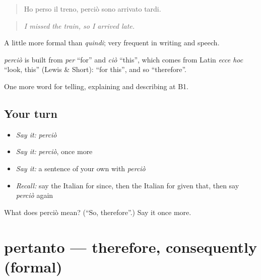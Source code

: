 \begin{quote}
Ho perso il treno, perciò sono arrivato tardi.
\end{quote}

\begin{quote}
\emph{I missed the train, so I arrived late.}
\end{quote}

A little more formal than \emph{quindi}; very frequent in writing and speech.

\begin{cousinweb}
\emph{perciò} is built from \emph{per} \textquotedblleft{}for\textquotedblright{} and \emph{ciò} \textquotedblleft{}this\textquotedblright{}, which comes from Latin \emph{ecce hoc} \textquotedblleft{}look, this\textquotedblright{} (Lewis \& Short): \textquotedblleft{}for this\textquotedblright{}, and so \textquotedblleft{}therefore\textquotedblright{}.
\end{cousinweb}

\begin{grammarlens}[title={What you've built}]
One more word for telling, explaining and describing at B1.
\end{grammarlens}

\subsection*{Your turn}
\begin{itemize}
\raggedright
  \item \emph{Say it:} \emph{perciò}
  \item \emph{Say it:} \emph{perciò}, once more
  \item \emph{Say it:} a sentence of your own with \emph{perciò}
  \item \emph{Recall:} say the Italian for since, then the Italian for given that, then say \emph{perciò} again
\end{itemize}

\begin{tcolorbox}[breakable,colback=teal!4,colframe=teal!35!black,title={Before you move on}]
What does perciò mean? (\textquotedblleft{}So, therefore\textquotedblright{}.) Say it once more.
\end{tcolorbox}
\section[pertanto]{pertanto — therefore, consequently (formal)}

\label{lesson:IT-C350-pertanto}



